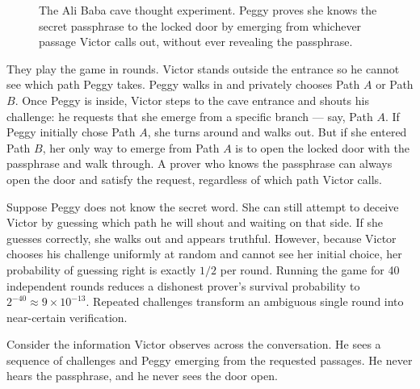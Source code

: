 \begin{figure}[H]
\caption{The Ali Baba cave thought experiment. Peggy proves she knows the secret passphrase to the locked door by emerging from whichever passage Victor calls out, without ever revealing the passphrase.}
\label{ch31:fig-cave}
\end{figure}

They play the game in rounds. Victor stands outside the entrance so he cannot see which path
Peggy takes. Peggy walks in and privately chooses Path $A$ or Path $B$. Once Peggy is inside,
Victor steps to the cave entrance and shouts his challenge: he requests that she emerge from
a specific branch --- say, Path $A$. If Peggy initially chose Path $A$, she turns around
and walks out. But if she entered Path $B$, her only way to emerge from Path $A$ is to open the
locked door with the passphrase and walk through. A prover who knows the passphrase can always open the door and satisfy
the request, regardless of which path Victor calls.

\begin{intuitionbox}
Suppose Peggy does not know the secret word. She can still attempt to deceive Victor by guessing
which path he will shout and waiting on that side. If she guesses correctly, she walks out and appears
truthful. However, because Victor chooses his challenge uniformly at random and cannot see her initial
choice, her probability of guessing right is exactly $1/2$ per round.
Running the game for 40 independent rounds reduces a dishonest prover's survival probability to
$2^{-40} \approx 9 \times 10^{-13}$. Repeated challenges transform an ambiguous single round into
near-certain verification.
\end{intuitionbox}

Consider the information Victor observes across the conversation. He sees a sequence of challenges
and Peggy emerging from the requested passages. He never hears the passphrase, and he never sees the
door open.

